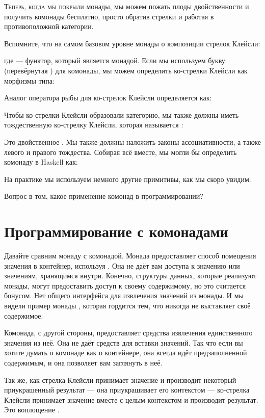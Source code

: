 
\lettrine[lhang=0.17]{Т}{еперь, когда мы покрыли} монады, мы можем пожать плоды двойственности и
получить комонады бесплатно, просто обратив стрелки и работая в
противоположной категории.

Вспомните, что на самом базовом уровне монады о композиции стрелок
Клейсли:

где  --- функтор, который является монадой. Если мы используем букву
 (перевёрнутая ) для комонады, мы можем определить
ко-стрелки Клейсли как морфизмы типа:

Аналог оператора рыбы для ко-стрелок Клейсли определяется как:

Чтобы ко-стрелки Клейсли образовали категорию, мы также должны иметь
тождественную ко-стрелку Клейсли, которая называется :

Это двойственное . Мы также должны наложить законы
ассоциативности, а также левого и правого тождества. Собирая всё
вместе, мы могли бы определить комонаду в Haskell как:

На практике мы используем немного другие примитивы, как мы скоро увидим.

Вопрос в том, какое применение комонад в программировании?

\section{Программирование с комонадами}

Давайте сравним монаду с комонадой. Монада предоставляет способ
помещения значения в контейнер, используя . Она не даёт
вам доступа к значению или значениям, хранящимся внутри. Конечно, структуры
данных, которые реализуют монады, могут предоставить доступ к своему содержимому,
но это считается бонусом. Нет общего интерфейса для
извлечения значений из монады. И мы видели пример
монады , которая гордится тем, что никогда не выставляет своё содержимое.

Комонада, с другой стороны, предоставляет средства извлечения единственного
значения из неё. Она не даёт средств для вставки значений. Так что если вы
хотите думать о комонаде как о контейнере, она всегда идёт предзаполненной
содержимым, и она позволяет вам заглянуть в неё.

Так же, как стрелка Клейсли принимает значение и производит некоторый приукрашенный
результат --- она приукрашивает его контекстом --- ко-стрелка Клейсли принимает
значение вместе с целым контекстом и производит результат. Это
воплощение .

